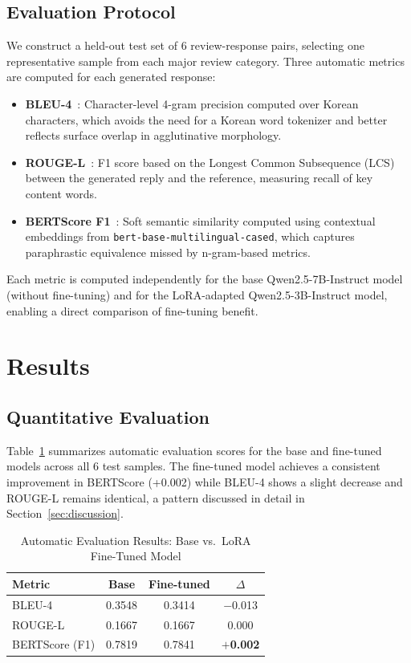 \documentclass[conference]{IEEEtran}
\begin{document}
\subsection{Evaluation Protocol}

We construct a held-out test set of 6 review-response pairs,
selecting one representative sample from each major review category.
Three automatic metrics are computed for each generated response:

\begin{itemize}
    \item \textbf{BLEU-4}~\cite{papineni2002}: Character-level
    4-gram precision computed over Korean characters, which avoids
    the need for a Korean word tokenizer and better reflects surface
    overlap in agglutinative morphology.
    \item \textbf{ROUGE-L}~\cite{lin2004}: F1 score based on the
    Longest Common Subsequence (LCS) between the generated reply and
    the reference, measuring recall of key content words.
    \item \textbf{BERTScore F1}~\cite{bertscore2020}: Soft semantic
    similarity computed using contextual embeddings from
    \texttt{bert-base-\allowbreak{}multilingual-cased}, which captures paraphrastic
    equivalence missed by n-gram-based metrics.
\end{itemize}

Each metric is computed independently for the base Qwen2.5-7B-Instruct
model (without fine-tuning) and for the LoRA-adapted Qwen2.5-3B-Instruct
model, enabling a direct comparison of fine-tuning benefit.

\section{Results}

\subsection{Quantitative Evaluation}

Table~\ref{tab:results} summarizes automatic evaluation scores for the
base and fine-tuned models across all 6 test samples.
The fine-tuned model achieves a consistent improvement in BERTScore
(+0.002) while BLEU-4 shows a slight decrease and ROUGE-L remains
identical, a pattern discussed in detail in Section~\ref{sec:discussion}.

\begin{table}[t]
\centering
\caption{Automatic Evaluation Results: Base vs.\ LoRA Fine-Tuned Model}
\label{tab:results}
\begin{tabular}{lccc}
\toprule
\textbf{Metric} & \textbf{Base} & \textbf{Fine-tuned} & \textbf{$\Delta$} \\
\midrule
BLEU-4          & 0.3548 & 0.3414 & $-$0.013 \\
ROUGE-L         & 0.1667 & 0.1667 & \phantom{$-$}0.000 \\
BERTScore (F1)  & 0.7819 & 0.7841 & $+$\textbf{0.002} \\
\bottomrule
\end{tabular}
\end{table}
\end{document}
